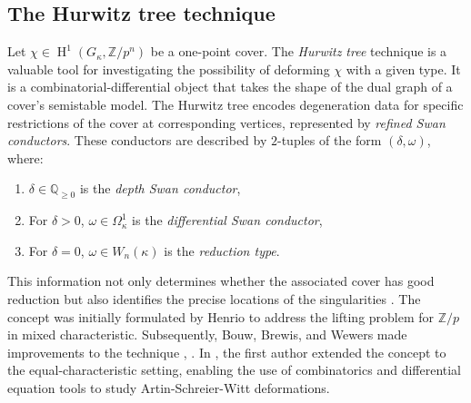 \documentclass{compositio}
\theoremstyle{remark}
\theoremstyle{remark}
\DeclareMathOperator{\cohom}{H}
\begin{document}
\subsection{The Hurwitz tree technique}
Let $\chi \in \cohom^1(G_{\kappa}, \mathbb{Z}/p^n)$ be a one-point cover. The \textit{Hurwitz tree} technique is a valuable tool for investigating the possibility of deforming $\chi$ with a given type. It is a combinatorial-differential object that takes the shape of the dual graph of a cover's semistable model. The Hurwitz tree encodes degeneration data for specific restrictions of the cover at corresponding vertices, represented by \textit{refined Swan conductors}. These conductors are described by $2$-tuples of the form $(\delta, \omega)$, where:
\begin{enumerate}
    \item $\delta \in \mathbb{Q}_{\ge 0}$ is the \textit{depth Swan conductor},
    \item For $\delta > 0$, $\omega \in \Omega^1_{\kappa}$ is the \textit{differential Swan conductor},
    \item For $\delta = 0$, $\omega \in W_n(\kappa)$ is the \textit{reduction type}.
\end{enumerate}

This information not only determines whether the associated cover has good reduction but also identifies the precise locations of the singularities \cite{MR904945}. The concept was initially formulated by Henrio \cite{2000math.....11098H} to address the lifting problem for $\mathbb{Z}/p$ in mixed characteristic. Subsequently, Bouw, Brewis, and Wewers made improvements to the technique \cite{MR2254623}, \cite{MR2534115}. In \cite{2020arXiv201013614D}, the first author extended the concept to the equal-characteristic setting, enabling the use of combinatorics and differential equation tools to study Artin-Schreier-Witt deformations.
\end{document}

